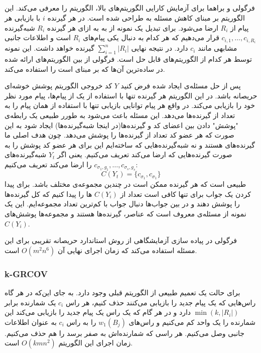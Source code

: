  \subsection{}
 فرگولی و براهما برای آزمایش کارایی الگوریتم‌های بالا، الگوریتم
 را معرفی می‌کند. این الگوریتم بر مبنای کاهش مسئله به
 \icod
 طراحی شده است. در 
 \picod
 هر گیرنده 
 $i$
 با بازیابی هر پیام از
 $R_i$
 ارضا می‌شود. برای تبدیل یک نمونه از
 \picod
 به
 \icod
 به ازای هر گیرنده
 $R_i$
 شبه‌گیرنده 
 $c_{i, 1}, \ldots, c_{i, {R_i}}$
 قرار می‌دهیم که هر کدام به دنبال یکی پیام‌های
 $R_i$
 است و اطلاعات جانبی مشابهی مانند
 $c_i$
 دارد. در نتیجه 
 \icod
 نهایی 
 $\sum\limits_{i = 1}^{n} |R_i|$
 گیرنده خواهد داشت. این نمونه توسط هر کدام از الگوریتم‌های
 \icod
 قابل حل است. فرگولی از بین الگوریتم‌های ارائه شده در
 \cite{25}
 ساده‌ترین آن‌ها که بر مبنای
 است را استفاده می‌کند.
 
 پس از حل مسئله‌ی
 \icod
 ایجاد شده فرض کنید 
 $Y$
 کد خروجی الگوریتم پوشش خوشه‌ای حریصانه باشد. در این الگوریتم هر گیرنده تنها با استفاده از یک از پیام‌ها، پیام مورد نظر خود را بازیابی می‌کند. در واقع هر پیام توانایی بازیابی تنها با استفاده از همان پیام را به تعداد از گیرنده‌ها می‌دهد. این مسئله باعث می‌شود به طورر طبیعی یک رابطه‌ی "پوشش" دادن بین اعضای کد و گیرنده‌ها(در اینجا شبه‌گیرنده‌ها) ایجاد شود به این صورت که هر عضو کد تعداد از گیرنده‌ها را پوشش می‌دهد. چون هدف اصلی ما گیرنده‌های
 \picod
 هستند و نه شبه‌گیرنده‌هایی که ساخته‌ایم این برای هر عضو کد پوشش را به صورت گیرنده‌هایی که ارضا می‌کند تعریف می‌کنیم. یعنی اگر
 $Y_t$
 شبه‌گیرنده‌های
 $c_{\sigma_1, g_1}, \ldots, c_{\sigma_s, g_s}$
 را ارضا می‌کند تعریف می‌کنیم:
 $$C(Y_t) =\{ c_{\sigma_1}, c_{\sigma_1}\}$$
 طبیعی است که هر گیرنده ممکن است در چندین مجموعه‌ی مختلف باشد. برای پیدا کردن یک جواب برای
 \picod
 تنها کافی است تعداد از 
 $C(Y_i)$
 ها را پیدا کنیم که کل گیرنده‌ها را پوشش دهند و در بین جواب‌ها دنبال جواب با کم‌ترین تعداد مجموعه‌‌ایم. این یک نمونه از مسئله‌ی معروف
 است که عناصر، گیرنده‌ها هستند و مجموعه‌ها پوشش‌های
 $C(Y_i)$.
 
 فرگولی در پیاده سازی آزمایشگاهی از روش استاندارد حریصانه تقریبی برای این مسئله استفاده می‌کند که زمان اجرای نهایی آن
 $O(m^2 n^6)$
 است.
\subsubsection{k-GRCOV}
برای حالت
\picodt
یک تعمیم طبیعی از الگوریتم قبلی وجود دارد. به جای این‌که در هر گاه راس‌هایی که یک پیام جدید را بازیابی می‌کنند حذف کنیم، هر راس 
$c_i$
یک شمارنده برابر
$\min(k, |R_i|)$
دارد و در هر گام که یک راس یک پیام جدید را بازیابی می‌کند این شمارنده را یک واحد کم می‌کنیم و راس‌های
$w_1(B_j)$
را به راس
$c_i$
به عنوان اطلاعات جانبی وصل می‌کنیم. هر راسی که شمارنده‌اش به صفر برسد را هم حذف می‌کنیم. زمان اجرای این الگوریتم
$O(kmn^2)$
است.

